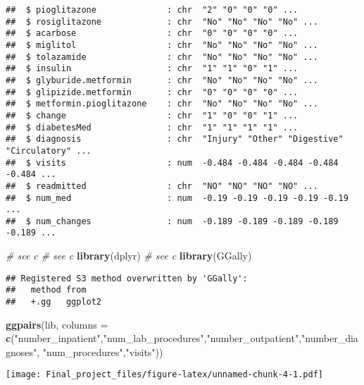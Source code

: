 \documentclass[
]{article}
\newenvironment{Shaded}{\begin{snugshade}}{\end{snugshade}}
\newcommand{\AttributeTok}[1]{\textcolor[rgb]{0.13,0.29,0.53}{#1}}
\newcommand{\CommentTok}[1]{\textcolor[rgb]{0.56,0.35,0.01}{\textit{#1}}}
\newcommand{\FunctionTok}[1]{\textcolor[rgb]{0.13,0.29,0.53}{\textbf{#1}}}
\newcommand{\NormalTok}[1]{#1}
\newcommand{\StringTok}[1]{\textcolor[rgb]{0.31,0.60,0.02}{#1}}
\begin{document}
\begin{verbatim}
##  $ pioglitazone              : chr  "2" "0" "0" "0" ...
##  $ rosiglitazone             : chr  "No" "No" "No" "No" ...
##  $ acarbose                  : chr  "0" "0" "0" "0" ...
##  $ miglitol                  : chr  "No" "No" "No" "No" ...
##  $ tolazamide                : chr  "No" "No" "No" "No" ...
##  $ insulin                   : chr  "1" "1" "0" "1" ...
##  $ glyburide.metformin       : chr  "No" "No" "No" "No" ...
##  $ glipizide.metformin       : chr  "0" "0" "0" "0" ...
##  $ metformin.pioglitazone    : chr  "No" "No" "No" "No" ...
##  $ change                    : chr  "1" "0" "0" "1" ...
##  $ diabetesMed               : chr  "1" "1" "1" "1" ...
##  $ diagnosis                 : chr  "Injury" "Other" "Digestive" "Circulatory" ...
##  $ visits                    : num  -0.484 -0.484 -0.484 -0.484 -0.484 ...
##  $ readmitted                : chr  "NO" "NO" "NO" "NO" ...
##  $ num_med                   : num  -0.19 -0.19 -0.19 -0.19 -0.19 ...
##  $ num_changes               : num  -0.189 -0.189 -0.189 -0.189 -0.189 ...
\end{verbatim}

\begin{Shaded}
\begin{Highlighting}[]
\CommentTok{\# see c}
 \CommentTok{\# see c}
\FunctionTok{library}\NormalTok{(dplyr)}
\CommentTok{\# see c}
\FunctionTok{library}\NormalTok{(GGally)}
\end{Highlighting}
\end{Shaded}

\begin{verbatim}
## Registered S3 method overwritten by 'GGally':
##   method from   
##   +.gg   ggplot2
\end{verbatim}

\begin{Shaded}
\begin{Highlighting}[]
\FunctionTok{ggpairs}\NormalTok{(lib, }\AttributeTok{columns =} \FunctionTok{c}\NormalTok{(}\StringTok{"number\_inpatient"}\NormalTok{,}\StringTok{"num\_lab\_procedures"}\NormalTok{,}\StringTok{"number\_outpatient"}\NormalTok{,}\StringTok{"number\_diagnoses"}\NormalTok{,}
                         \StringTok{"num\_procedures"}\NormalTok{,}\StringTok{"visits"}\NormalTok{))}
\end{Highlighting}
\end{Shaded}

\texttt{[image: Final\_project\_files/figure-latex/unnamed-chunk-4-1.pdf]}
\end{document}
